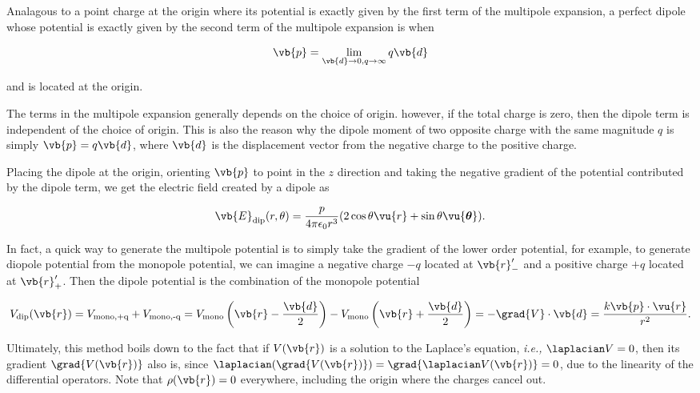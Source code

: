 \documentclass[english,a4paper,12pt]{report}
\begin{document}
Analagous to a point charge at the origin where its potential is exactly given by the first term of the multipole expansion, a perfect dipole whose potential is exactly given by the second term of the multipole expansion is when 

\begin{equation}
    \vb{p} = \lim_{\vb{d}  \to 0, q \to \infty} q\vb{d}  
\end{equation}

and is located at the origin. 

The terms in the multipole expansion generally depends on the choice of origin. however, if the total charge is zero, then the dipole term is independent of the choice of origin. This is also the reason why the dipole moment of two opposite charge with the same magnitude \(q\) is simply \(\vb{p} = q\vb{d} \), where \(\vb{d} \) is the displacement vector from the negative charge to the positive charge. 

Placing the dipole at the origin, orienting \(\vb{p} \) to point in the \(z\) direction and taking the negative gradient of the potential contributed by the dipole term, we get the electric field created by a dipole as

\begin{equation}
    \vb{E} _{\text{dip} } (r, \theta ) = \frac{p}{4\pi \epsilon _0 r^3 }(2\cos \theta \vu{r} + \sin \theta \vu{\boldsymbol{\theta } }). 
\end{equation}

In fact, a quick way to generate the multipole potential is to simply take the gradient of the lower order potential, for example, to generate diopole potential from the monopole potential, we can imagine a negative charge \(-q\) located at \(\vb{r} '_{-}  \) and a positive charge \(+q\) located at \(\vb{r}' _{+}  \). Then the dipole potential is the combination of the monopole potential

\begin{equation}
    V_{\text{dip} } (\vb{r} ) = V_{\text{mono,+q} } + V_{\text{mono,-q} } = V_{\text{mono} }\left( \vb{r} - \frac{\vb{d} }{2}  \right) - V_{\text{mono} } \left( \vb{r} + \frac{\vb{d} }{2}  \right) = - \grad{V} \cdot \vb{d} = \frac{k \vb{p} \cdot \vu{r} }{r^2}. 
\end{equation}

Ultimately, this method boils down to the fact that if \(V (\vb{r} )\) is a solution to the Laplace's equation, \textit{i.e.,} \(\laplacian V = 0\), then its gradient \(\grad{V(\vb{r} )} \) also is, since \(\laplacian (\grad{V(\vb{r} )} ) = \grad{\laplacian V(\vb{r} )} = 0 \), due to the linearity of the differential operators. Note that \(\rho (\vb{r} ) = 0\) everywhere, including the origin where the charges cancel out.
\end{document}
